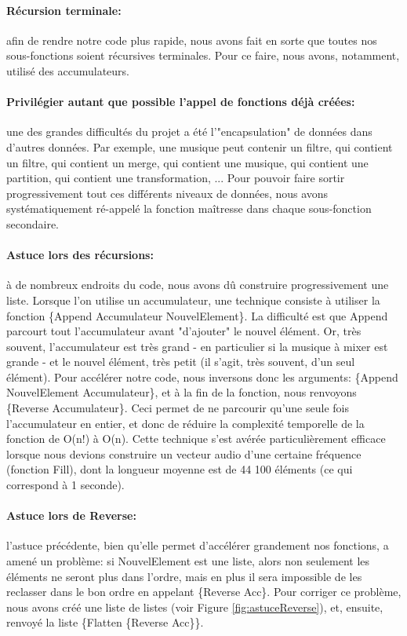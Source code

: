\documentclass[10pt,a4paper]{article}
\begin{document}
\paragraph{Récursion terminale:} afin de rendre notre code plus rapide, nous avons fait en sorte que toutes nos sous-fonctions soient récursives terminales. Pour ce faire, nous avons, notamment, utilisé des accumulateurs.
 
 \paragraph{Privilégier autant que possible l'appel de fonctions déjà créées:} une des grandes difficultés du projet a été l'"encapsulation" de données dans d'autres données. Par exemple, une musique peut contenir un filtre, qui contient un filtre, qui contient un merge, qui contient une musique, qui contient une partition, qui contient une transformation, ... Pour pouvoir faire sortir progressivement tout ces différents niveaux de données, nous avons systématiquement ré-appelé la fonction maîtresse dans chaque sous-fonction secondaire.

\paragraph{Astuce lors des récursions:}
à de nombreux endroits du code, nous avons dû construire progressivement une liste. Lorsque l'on utilise un accumulateur, une technique  consiste à utiliser la fonction \{Append Accumulateur NouvelElement\}. La difficulté est que Append  parcourt tout l'accumulateur avant "d'ajouter" le nouvel élément. Or, très souvent, l'accumulateur est très grand - en particulier si la musique à mixer est grande - et le nouvel élément, très petit (il s'agit, très souvent, d'un seul élément). Pour accélérer notre code, nous inversons donc les arguments: \{Append NouvelElement Accumulateur\}, et à la fin de la fonction, nous renvoyons \{Reverse Accumulateur\}. Ceci permet de ne parcourir qu'une seule fois l'accumulateur en entier, et donc de réduire la complexité temporelle de la fonction de O(n!) à O(n). Cette technique s'est avérée particulièrement efficace lorsque nous devions construire un vecteur audio d'une certaine fréquence (fonction Fill), dont la longueur moyenne est de 44 100 éléments (ce qui correspond à 1 seconde).

\paragraph{Astuce lors de Reverse:} l'astuce précédente, bien qu'elle permet d'accélérer grandement nos fonctions, a amené un problème: si NouvelElement est une liste, alors non seulement les éléments ne seront plus dans l'ordre, mais en plus il sera impossible de les reclasser dans le bon ordre en appelant \{Reverse Acc\}. Pour corriger ce problème, nous avons  créé une liste de listes (voir Figure \ref{fig:astuceReverse}), et, ensuite, renvoyé la liste \{Flatten \{Reverse Acc\}\}.
\end{document}
